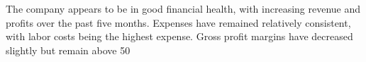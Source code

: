 

The company appears to be in good financial health, with increasing revenue and profits over the past five months. Expenses have remained relatively consistent, with labor costs being the highest expense. Gross profit margins have decreased slightly but remain above 50%